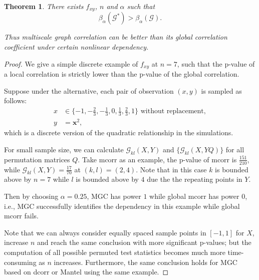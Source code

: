 \documentclass[11pt]{article}
\providecommand{\mb}[1]{\boldsymbol{#1}}
\newcommand{\G}{\mathcal{G}}
\newtheorem{appThm}{Theorem}
\begin{document}
\begin{appThm}
There exists $f_{xy}$, $n$ and $\alpha$ such that 
\begin{equation}
\beta_{\alpha}(\G^{*}) > \beta_{\alpha}(\G).
\end{equation}

Thus multiscale graph correlation can be better than its global correlation coefficient under certain nonlinear dependency.
\end{appThm}
\begin{proof}
We give a simple discrete example of $f_{xy}$ at $n=7$, such that the p-value of a local correlation is strictly lower than the p-value of the global correlation. %

Suppose under the alternative, each pair of observation $(x,y)$ is sampled as follows:
\begin{align*} 
x &\in \{-1,-\frac{2}{3},-\frac{1}{3},0,\frac{1}{3},\frac{2}{3},1\} \mbox{ without replacement}, \\
y &= \mb{x}^2,
\end{align*}
which is a discrete version of the quadratic relationship in the simulations.

For small sample size, we can calculate $\G_{kl}(X, Y)$ and $\{\G_{kl}(X, YQ)\}$ for all permutation matrices $Q$. Take mcorr as an example, the p-value of mcorr is $\frac{151}{210}$, while $\G_{kl}(X, Y)=\frac{17}{70}$ at $(k,l)=(2,4)$. Note that in this case $k$ is bounded above by $n=7$ while $l$ is bounded above by $4$ due the the repeating points in $Y$. 

Then by choosing $\alpha=0.25$, MGC has power $1$ while global mcorr has power $0$, i.e., MGC successfully identifies the dependency in this example while global mcorr fails. 

Note that we can always consider equally spaced sample points in $[-1,1]$ for $X$, increase $n$ and reach the same conclusion with more significant p-values; but the computation of all possible permuted test statistics becomes much more time-consuming as $n$ increases. Furthermore, the same conclusion holds for MGC based on dcorr or Mantel using the same example.
\end{proof}



\end{document}
